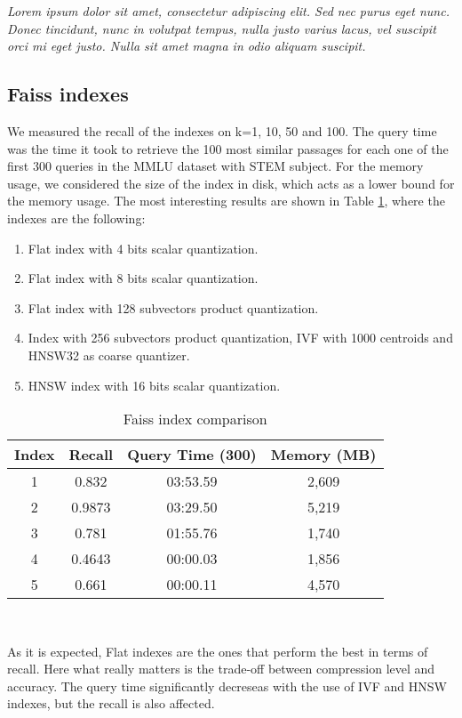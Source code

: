\documentclass[11pt]{article}
\begin{document}
\textit{Lorem ipsum dolor sit amet, consectetur adipiscing elit. Sed nec purus eget
nunc. Donec tincidunt, nunc in volutpat tempus, nulla justo varius lacus, vel
suscipit orci mi eget justo. Nulla sit amet magna in odio aliquam suscipit.}

\subsection{Faiss indexes}

We measured the recall of the indexes on k=1, 10, 50 and 100. The query time was 
the time it took to retrieve the 100 most similar passages for each one of the first 300
queries in the MMLU dataset with STEM subject. 
For the memory usage, we considered the size of the index in disk, which acts as a lower
bound for the memory usage.
The most interesting results are shown in Table \ref{tab:faiss-index}, where the indexes 
are the following:

\begin{enumerate}
    \item Flat index with 4 bits scalar quantization.
    \item Flat index with 8 bits scalar quantization.
    \item Flat index with 128 subvectors product quantization. 
    \item Index with 256 subvectors product quantization, IVF with 1000 centroids
    and HNSW32 as coarse quantizer.
    \item HNSW index with 16 bits scalar quantization.
\end{enumerate}

\begin{table}[h]
\centering
\begin{tabular}{|c|c|c|c|}
\hline
Index & Recall & Query Time (300) & Memory (MB) \\
\hline
1 & 0.832 & 03:53.59 & 2,609 \\
2 & 0.9873 & 03:29.50 & 5,219 \\
3 & 0.781 & 01:55.76 & 1,740 \\
4 & 0.4643 & 00:00.03 & 1,856 \\
5 & 0.661 & 00:00.11 & 4,570 \\
\hline
\end{tabular}
\caption{Faiss index comparison}
\
\label{tab:faiss-index}
\end{table}

As it is expected, Flat indexes are the ones that perform the best in terms of recall.
Here what really matters is the trade-off between compression level and accuracy.
The query time significantly decreseas with the use of IVF and HNSW indexes, but the recall
is also affected.
\end{document}
